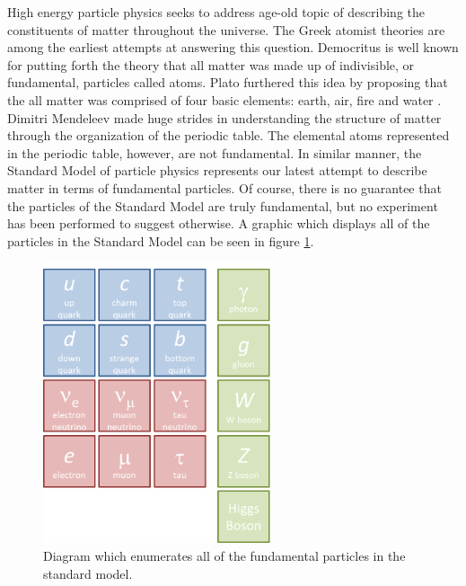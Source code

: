 High energy particle physics seeks to address age-old topic of describing the constituents of matter throughout the universe.  The Greek atomist theories are among the earliest attempts at answering this question.  Democritus is well known for putting forth the theory that all matter was made up of indivisible, or fundamental, particles called atoms.  Plato furthered this idea by proposing that the all matter was comprised of four basic elements: earth, air, fire and water \cite{berryman2008atomism}.  Dimitri Mendeleev made huge strides in understanding the structure of matter through the organization of the periodic table.  The elemental atoms represented in the periodic table, however, are not fundamental.  In similar manner, the Standard Model of particle physics represents our latest attempt to describe matter in terms of fundamental particles.  Of course, there is no guarantee that the particles of the Standard Model are truly fundamental, but no experiment has been performed to suggest otherwise.  A graphic which displays all of the particles in the Standard Model can be seen in figure \ref{sm}.


\begin{figure}[h]
  \begin{center}
    \includegraphics[width=0.6\textwidth]{figures/figures/sm.png}
  \end{center}
  \caption{Diagram which enumerates all of the fundamental particles in the standard model.}
  \label{sm}
\end{figure}


